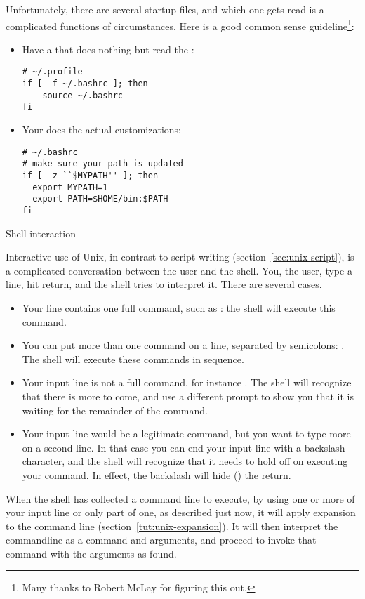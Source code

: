 Unfortunately, there are several startup files, and which one gets read
is a complicated functions of circumstances. Here is a good common sense
guideline\footnote{Many thanks to Robert McLay for figuring this out.}:
\begin{itemize}
\item Have a  that does nothing but read the :
\begin{verbatim}
# ~/.profile
if [ -f ~/.bashrc ]; then
    source ~/.bashrc
fi
\end{verbatim}
\item Your  does the actual customizations:
\begin{verbatim}
# ~/.bashrc
# make sure your path is updated
if [ -z ``$MYPATH'' ]; then
  export MYPATH=1
  export PATH=$HOME/bin:$PATH
fi
\end{verbatim}
\end{itemize}


 {Shell interaction}

Interactive use of Unix, in contrast to script writing
(section~\ref{sec:unix-script}), is a complicated conversation between
the user and the shell. You, the user, type a line, hit return, and
the shell tries to interpret it. There are several cases.
\begin{itemize}
\item Your line contains one full command, such as : the
  shell will execute this command.
\item You can put more than one command on a line, separated by
  semicolons: . The shell will execute these
  commands in sequence.
\item Your input line is not a full command, for instance . The shell will recognize that there is more to come, and use
  a different prompt to show you that it is waiting for the remainder
  of the command.
\item Your input line would be a legitimate command, but you want to
  type more on a second line. In that case you can end your input line
  with a backslash character, and the shell will recognize that it
  needs to hold off on executing your command. In effect, the
  backslash will hide () the return.
\end{itemize}

When the shell has collected a command line to execute, by using one or
more of your input line or only part of one, as described just now, it
will apply expansion to the command line
(section~\ref{tut:unix-expansion}). It will then interpret the
commandline as a command and arguments, and proceed to invoke that
command with the arguments as found.

